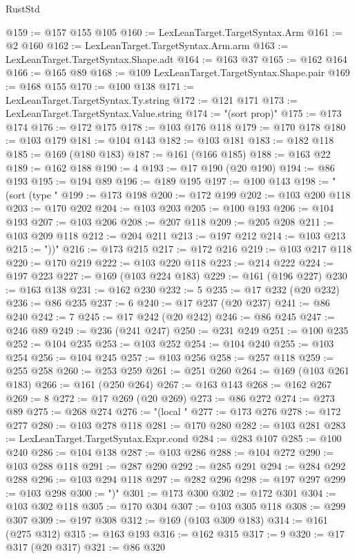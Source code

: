 \begin{lexlean}{RustStd}
\begin{coremodule}
{\begin{coremodule}
{{{{{{{{{{{{{{{{{{{{{{{{{{@159 := @157 @155 @105
@160 := LexLeanTarget.TargetSyntax.Arm
@161 := @2 @160
@162 := LexLeanTarget.TargetSyntax.Arm.arm
@163 := LexLeanTarget.TargetSyntax.Shape.adt
@164 := @163 @37
@165 := @162 @164
@166 := @165 @89
@168 := @109 LexLeanTarget.TargetSyntax.Shape.pair
@169 := @168 @155
@170 := @100 @138
@171 := LexLeanTarget.TargetSyntax.Ty.string
@172 := @121 @171
@173 := LexLeanTarget.TargetSyntax.Value.string
@174 := "(sort prop)"
@175 := @173 @174
@176 := @172 @175
@178 := @103 @176 @118
@179 := @170 @178
@180 := @103 @179
@181 := @104 @143
@182 := @103 @181
@183 := @182 @118
@185 := @169 (@180 @183)
@187 := @161 (@166 @185)
@188 := @163 @22
@189 := @162 @188
@190 := 4
@193 := @17 @190 (@20 @190)
@194 := @86 @193
@195 := @194 @89
@196 := @189 @195
@197 := @100 @143
@198 := "(sort (type "
@199 := @173 @198
@200 := @172 @199
@202 := @103 @200 @118
@203 := @170 @202
@204 := @103 @203
@205 := @100 @193
@206 := @104 @193
@207 := @103 @206
@208 := @207 @118
@209 := @205 @208
@211 := @103 @209 @118
@212 := @204 @211
@213 := @197 @212
@214 := @103 @213
@215 := "))"
@216 := @173 @215
@217 := @172 @216
@219 := @103 @217 @118
@220 := @170 @219
@222 := @103 @220 @118
@223 := @214 @222
@224 := @197 @223
@227 := @169 (@103 @224 @183)
@229 := @161 (@196 @227)
@230 := @163 @138
@231 := @162 @230
@232 := 5
@235 := @17 @232 (@20 @232)
@236 := @86 @235
@237 := 6
@240 := @17 @237 (@20 @237)
@241 := @86 @240
@242 := 7
@245 := @17 @242 (@20 @242)
@246 := @86 @245
@247 := @246 @89
@249 := @236 (@241 @247)
@250 := @231 @249
@251 := @100 @235
@252 := @104 @235
@253 := @103 @252
@254 := @104 @240
@255 := @103 @254
@256 := @104 @245
@257 := @103 @256
@258 := @257 @118
@259 := @255 @258
@260 := @253 @259
@261 := @251 @260
@264 := @169 (@103 @261 @183)
@266 := @161 (@250 @264)
@267 := @163 @143
@268 := @162 @267
@269 := 8
@272 := @17 @269 (@20 @269)
@273 := @86 @272
@274 := @273 @89
@275 := @268 @274
@276 := "(local "
@277 := @173 @276
@278 := @172 @277
@280 := @103 @278 @118
@281 := @170 @280
@282 := @103 @281
@283 := LexLeanTarget.TargetSyntax.Expr.cond
@284 := @283 @107
@285 := @100 @240
@286 := @104 @138
@287 := @103 @286
@288 := @104 @272
@290 := @103 @288 @118
@291 := @287 @290
@292 := @285 @291
@294 := @284 @292 @288
@296 := @103 @294 @118
@297 := @282 @296
@298 := @197 @297
@299 := @103 @298
@300 := ")"
@301 := @173 @300
@302 := @172 @301
@304 := @103 @302 @118
@305 := @170 @304
@307 := @103 @305 @118
@308 := @299 @307
@309 := @197 @308
@312 := @169 (@103 @309 @183)
@314 := @161 (@275 @312)
@315 := @163 @193
@316 := @162 @315
@317 := 9
@320 := @17 @317 (@20 @317)
@321 := @86 @320
}}}}}}}}}}}}}}}}}}}}}}}}}}
\end{coremodule}}
\end{coremodule}
\end{lexlean}
